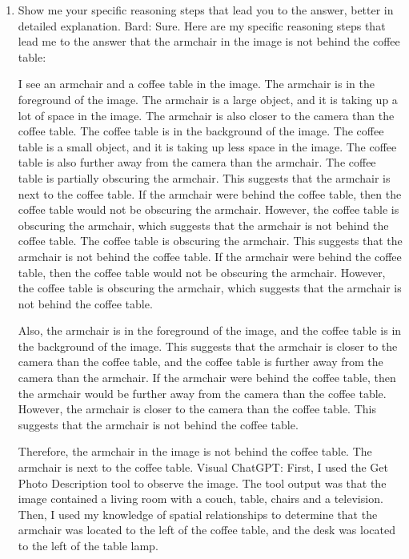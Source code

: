 \begin{enumerate}
    Therefore, the armchair in the image is not behind the coffee table. The armchair is next to the coffee table.
    \subitem Visual ChatGPT: The desk is located to the left of the table lamp.
    \item Show me your specific reasoning steps that lead you to the answer, better in detailed explanation.
    \subitem Bard: 
    Sure. Here are my specific reasoning steps that lead me to the answer that the armchair in the image is not behind the coffee table:
    
    I see an armchair and a coffee table in the image.
    The armchair is in the foreground of the image. The armchair is a large object, and it is taking up a lot of space in the image. The armchair is also closer to the camera than the coffee table.
    The coffee table is in the background of the image. The coffee table is a small object, and it is taking up less space in the image. The coffee table is also further away from the camera than the armchair.
    The coffee table is partially obscuring the armchair. This suggests that the armchair is next to the coffee table.
    If the armchair were behind the coffee table, then the coffee table would not be obscuring the armchair. However, the coffee table is obscuring the armchair, which suggests that the armchair is not behind the coffee table.
    The coffee table is obscuring the armchair. This suggests that the armchair is not behind the coffee table. If the armchair were behind the coffee table, then the coffee table would not be obscuring the armchair. However, the coffee table is obscuring the armchair, which suggests that the armchair is not behind the coffee table.
    
    Also, the armchair is in the foreground of the image, and the coffee table is in the background of the image. This suggests that the armchair is closer to the camera than the coffee table, and the coffee table is further away from the camera than the armchair. If the armchair were behind the coffee table, then the armchair would be further away from the camera than the coffee table. However, the armchair is closer to the camera than the coffee table. This suggests that the armchair is not behind the coffee table.
    
    Therefore, the armchair in the image is not behind the coffee table. The armchair is next to the coffee table.
    \subitem Visual ChatGPT: First, I used the Get Photo Description tool to observe the image. The tool output was that the image contained a living room with a couch, table, chairs and a television. Then, I used my knowledge of spatial relationships to determine that the armchair was located to the left of the coffee table, and the desk was located to the left of the table lamp.
\end{enumerate}
